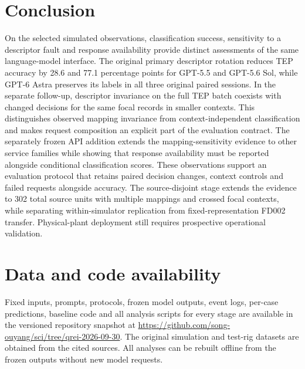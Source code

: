 \documentclass[11pt,a4paper]{article}
\begin{document}
\section{Conclusion}
On the selected simulated observations, classification success, sensitivity to a descriptor fault and response availability provide distinct assessments of the same language-model interface. The original primary descriptor rotation reduces TEP accuracy by 28.6 and 77.1 percentage points for GPT-5.5 and GPT-5.6 Sol, while GPT-6 Astra preserves its labels in all three original paired sessions. In the separate follow-up, descriptor invariance on the full TEP batch coexists with changed decisions for the same focal records in smaller contexts. This distinguishes observed mapping invariance from context-independent classification and makes request composition an explicit part of the evaluation contract. The separately frozen API addition extends the mapping-sensitivity evidence to other service families while showing that response availability must be reported alongside conditional classification scores. These observations support an evaluation protocol that retains paired decision changes, context controls and failed requests alongside accuracy. The source-disjoint stage extends the evidence to 302 total source units with multiple mappings and crossed focal contexts, while separating within-simulator replication from fixed-representation FD002 transfer. Physical-plant deployment still requires prospective operational validation.

\section*{Data and code availability}
Fixed inputs, prompts, protocols, frozen model outputs, event logs, per-case predictions, baseline code and all analysis scripts for every stage are available in the versioned repository snapshot at \url{https://github.com/song-ouyang/sci/tree/qrei-2026-09-30}. The original simulation and test-rig datasets are obtained from the cited sources. All analyses can be rebuilt offline from the frozen outputs without new model requests.

\appendix
\end{document}
